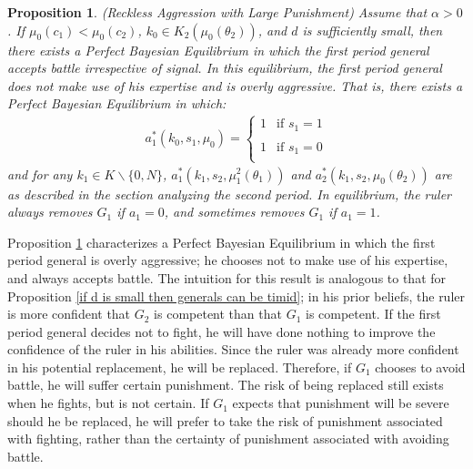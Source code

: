 \documentclass[11pt,]{article}
\newtheorem{proposition}[]{Proposition}
\begin{document}
\begin{proposition} (Reckless Aggression with Large Punishment) Assume that $\alpha>0$.  If $\mu_0(c_1)<\mu_0(c_2)$, $k_0\in K_2(\mu_0(\theta_2))$, and $d$ is sufficiently small, then there exists a Perfect Bayesian Equilibrium in which the first period general accepts battle irrespective of signal.  In this equilibrium, the first period general does not make use of his expertise and is overly aggressive.  That is, there exists a Perfect Bayesian Equilibrium in which:
\begin{align*}
a^*_1(k_0,s_1,\mu_0)=\left\{\begin{array}{ll}
1&\mbox{if }s_1=1\\
&\\
1&\mbox{if }s_1=0\\
\end{array}\right.
\end{align*}and for any $k_1\in K\backslash\{0,N\}$, $a^*_1(k_1,s_2,\mu_1^2(\theta_1))$ and $a^*_2(k_1,s_2,\mu_0(\theta_2))$ are as described in the section analyzing the second period.  In equilibrium, the ruler always removes $G_1$ if $a_1=0$, and sometimes removes $G_1$ if $a_1=1$.\label{if d is small then generals can be aggressive}
\end{proposition}\noindent  Proposition \ref{if d is small then generals can be aggressive} characterizes a Perfect Bayesian Equilibrium in which the first period general is overly aggressive; he chooses not to make use of his expertise, and always accepts battle.  The intuition for this result is analogous to that for Proposition \ref{if d is small then generals can be timid}; in his prior beliefs, the ruler is more confident that $G_2$ is competent than that $G_1$ is competent.  If the first period general decides not to fight, he will have done nothing to improve the confidence of the ruler in his abilities.  Since the ruler was already more confident in his potential replacement, he will be replaced.  Therefore, if $G_1$ chooses to avoid battle, he will suffer certain punishment.  The risk of being replaced still exists when he fights, but is not certain.  If $G_1$ expects that punishment will be severe should he be replaced, he will prefer to take the risk of punishment associated with fighting, rather than the certainty of punishment associated with avoiding battle.  
\end{document}
